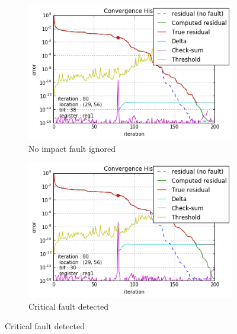 \begin{figure}[h]
\begin{minipage}[b]{0.48\linewidth}
	\begin{subfigure}[t]{\linewidth}
		\centering
		\includegraphics[width=\linewidth]{figures/gre_216a/convergence_history_threshold_0.png}
		\caption{No impact fault ignored}\label{fig:gre_216a_conv_hist_threshold_0}
	\end{subfigure}
    \quad
    \begin{subfigure}[t]{\linewidth}
		\centering
		\includegraphics[width=\linewidth]{figures/gre_216a/convergence_history_threshold_2.png}
		\caption{Critical fault detected}\label{fig:gre_216a_conv_hist_threshold_2}
	\end{subfigure}
    \end{minipage}
    \quad
    \begin{minipage}[b]{0.48\linewidth}
    	

\end{minipage}
\end{figure}

